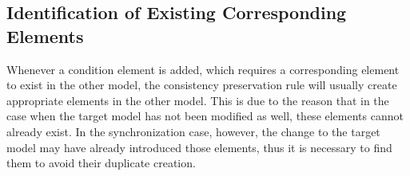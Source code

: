 


\subsection{Identification of Existing Corresponding Elements}
\label{chap:synchronization:achieving:identification}

Whenever a condition element is added, which requires a corresponding element to exist in the other model, the consistency preservation rule will usually create appropriate elements in the other model.
This is due to the reason that in the case when the target model has not been modified as well, these elements cannot already exist.
In the synchronization case, however, the change to the target model may have already introduced those elements, thus it is necessary to find them to avoid their duplicate creation.

